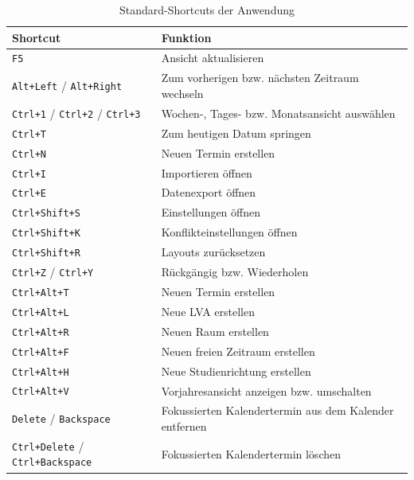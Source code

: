 \documentclass[12pt,a4paper]{article}
\begin{document}
\begin{table}[H]
\centering
\small
\caption{Standard-Shortcuts der Anwendung}
\label{tab:shortcut-overview}
\begin{tabularx}{\textwidth}{|L{3.3cm}|Y|}
\hline
\textbf{Shortcut} & \textbf{Funktion} \\
\hline
\texttt{F5} & Ansicht aktualisieren \\
\hline
\texttt{Alt+Left} / \texttt{Alt+Right} & Zum vorherigen bzw. nächsten Zeitraum wechseln \\
\hline
\texttt{Ctrl+1} / \texttt{Ctrl+2} / \texttt{Ctrl+3} & Wochen-, Tages- bzw. Monatsansicht auswählen \\
\hline
\texttt{Ctrl+T} & Zum heutigen Datum springen \\
\hline
\texttt{Ctrl+N} & Neuen Termin erstellen \\
\hline
\texttt{Ctrl+I} & Importieren öffnen \\
\hline
\texttt{Ctrl+E} & Datenexport öffnen \\
\hline
\texttt{Ctrl+Shift+S} & Einstellungen öffnen \\
\hline
\texttt{Ctrl+Shift+K} & Konflikteinstellungen öffnen \\
\hline
\texttt{Ctrl+Shift+R} & Layouts zurücksetzen \\
\hline
\texttt{Ctrl+Z} / \texttt{Ctrl+Y} & Rückgängig bzw. Wiederholen \\
\hline
\texttt{Ctrl+Alt+T} & Neuen Termin erstellen \\
\hline
\texttt{Ctrl+Alt+L} & Neue LVA erstellen \\
\hline
\texttt{Ctrl+Alt+R} & Neuen Raum erstellen \\
\hline
\texttt{Ctrl+Alt+F} & Neuen freien Zeitraum erstellen \\
\hline
\texttt{Ctrl+Alt+H} & Neue Studienrichtung erstellen \\
\hline
\texttt{Ctrl+Alt+V} & Vorjahresansicht anzeigen bzw. umschalten \\
\hline
\texttt{Delete} / \texttt{Backspace} & Fokussierten Kalendertermin aus dem Kalender entfernen \\
\hline
\texttt{Ctrl+Delete} / \texttt{Ctrl+Backspace} & Fokussierten Kalendertermin löschen \\
\hline
\end{tabularx}
\end{table}

\clearpage
\end{document}
